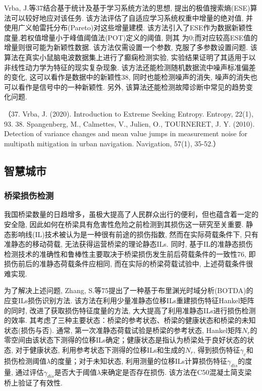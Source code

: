 \documentclass{Style/aas}
\begin{document}
\begin{multicols}{2}
  Vrba, J.等37结合基于统计及基于学习系统方法的思想, 提出的极值搜索熵(ESE)算法可以较好地应对该任务. 该方法评估了自适应学习系统权重中增量的绝对值, 并使用广义帕雷托分布(Pareto)对这些增量建模. 该方法引入了ESE作为数据新颖性度量,若权值增量小于峰值阈值法(POT)定义的阈值, 则其 为0;而对应较高ESE值的增量则很可能为新颖性数据. 该方法仅需设置一个参数, 克服了多参数设置问题. 该算法在真实小鼠脑电波数据集上进行了癫痫检测实验, 实验结果证明了其适用于以非线性动力学为特征的现实复杂现象. 该方法还能检测随机数据流中噪声标准偏差的变化, 这可以看作是数据中的新颖性38, 同时也能检测噪声的消失, 噪声的消失也可以看作是信号中的一种新颖性. 另外, 该算法还能检测故障诊断中常见的趋势变化问题.

  （37.	Vrba, J. (2020). Introduction to Extreme Seeking Entropy. Entropy, 22(1), 93.
  38.	Spangenberg, M., Calmettes, V., Julien, O., TOURNERET, J. Y. (2010). Detection of variance changes and mean value jumps in measurement noise for multipath mitigation in urban navigation. Navigation, 57(1), 35-52.）

  \subsection{智慧城市}
  \subsubsection{桥梁损伤检测}
  我国桥梁数量的日趋增多，虽极大提高了人民群众出行的便利，但也蕴含着一定的安全隐, 因此如何在桥梁具有危害性危险之前检测到其损伤这一研究至关重要. 静态影响线(IL)技术被认为是一种很有前途的损伤指数, 然而在实际荷载条件下, 只有准静态的移动荷载, 无法获得运营桥梁的理论静态ILs. 同时, 基于IL的准静态损伤检测技术的准确性和鲁棒性主要取决于桥梁损伤发生前后荷载条件的一致性76, 即损伤前后的准静态荷载条件应相同, 而在实际的桥梁荷载试验中, 上述荷载条件很难实现.

  为了解决上述问题, Zhang, S.等75提出了一种基于布里渊光时域分析(BOTDA)的应变ILs损伤识别方法. 该方法在利用少量准静态位移ILs重建损伤特征Hankel矩阵的同时, 改进了获取损伤特征度量的方法, 大大提高了利用准静态ILs进行损伤检测的效率. 其考虑了三种主要状态：桥梁的参考状态、桥梁的健康状态和桥梁的未知状态(损伤与否). 通常, 第一次准静态荷载试验是桥梁的参考状态, Hankel矩阵$N_r  $的零空间由该状态下测得的位移ILs确定；健康状态是指认为桥梁处于良好状态的状态, 对于健康状态, 利用参考状态下测得的位移ILs和生成的$N_r  $, 得到损伤特征$  \gamma _c$和损伤检测阈值$λ$的度量；对于未知状态, 利用测量的位移ILs计算损伤特征$\gamma _{dis} $的度量, 通过评估$\gamma _{dis} $是否大于阈值$λ$来确定是否存在损伤. 该方法在C50混凝土简支梁桥上验证了有效性.


\end{multicols}
\end{document}
